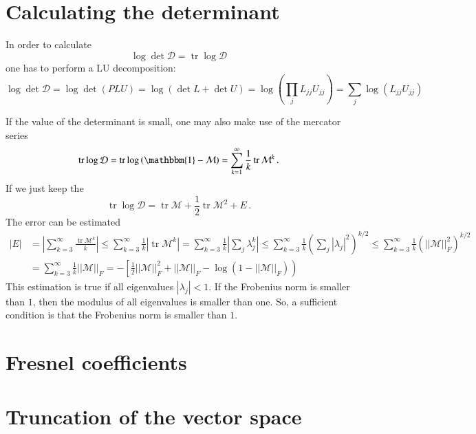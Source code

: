 \documentclass[superscriptaddress,prb]{revtex4-1}
\DeclareMathOperator{\trace}{tr}
\begin{document}
\section{Calculating the determinant}

In order to calculate
\begin{equation}
\log\det\mathcal{D} = \trace\log\mathcal{D}
\end{equation}
one has to perform a LU decomposition:
\begin{equation}
\log\det\mathcal{D} = \log\det\left(PLU\right) = \log\left(\det L + \det U\right) = \log\left(\prod_j L_{jj} U_{jj}\right) = \sum_j \log\left(L_{jj} U_{jj}\right)
\end{equation}

If the value of the determinant is small, one may also make use of the mercator series
\begin{equation}
\trace\log \mathcal{D} = \trace\log\left(\mathbbm{1}-\mathcal{M}\right) = \sum_{k=1}^\infty \frac{1}{k} \trace\mathcal{M}^k \,.
\end{equation}
If we just keep the
\begin{equation}
\trace\log\mathcal{D} = \trace\mathcal{M} + \frac{1}{2} \trace\mathcal{M}^2 + E \,.
\end{equation}
The error can be estimated
\begin{align}
|E| &=  \left|\sum_{k=3}^\infty \frac{\trace\mathcal{M}^k}{k}\right|
\le \sum_{k=3}^\infty \frac{1}{k} \left| \trace\mathcal{M}^k \right|
= \sum_{k=3}^\infty \frac{1}{k} \left| \sum_j \lambda_j^k \right|
\le \sum_{k=3}^\infty \frac{1}{k} \left(\sum_j |\lambda_j|^2\right)^{k/2}
\le \sum_{k=3}^\infty \frac{1}{k} \left(||\mathcal{M}||_F^2\right)^{k/2} \\
&= \sum_{k=3}^\infty \frac{1}{k} ||\mathcal{M}||_F = -\left[\frac{1}{2}||\mathcal{M}||_F^2+||\mathcal{M}||_F -\log\left(1-||\mathcal{M}||_F\right)\right)
\end{align}
This estimation is true if all eigenvalues $|\lambda_j| < 1$. If the Frobenius
norm is smaller than $1$, then the modulus of all eigenvalues is smaller than
one. So, a sufficient condition is that the Frobenius norm is smaller than $1$.

\section{Fresnel coefficients}
\section{Truncation of the vector space}
\end{document}

